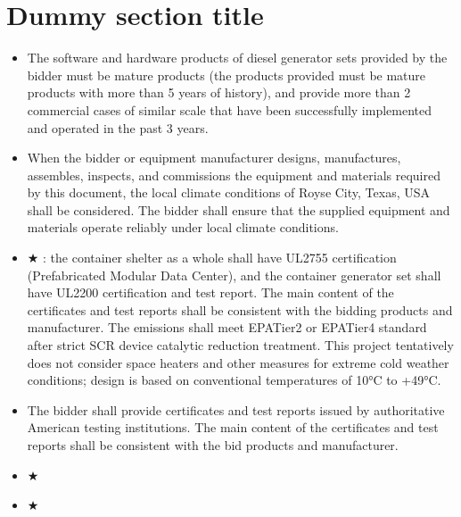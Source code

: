 \documentclass[a4paper,10pt,english,openany,oneside]{sphinxmanual}
\begin{document}
\section{Dummy section title}
\label{\detokenize{section2_requirements:id1}}\begin{itemize}
\item {} 
\sphinxAtStartPar
The software and hardware products of diesel generator sets provided by the bidder must be mature products (the products provided must be mature products with more than 5 years of history), and provide more than 2 commercial cases of similar scale that have been successfully implemented and operated in the past 3 years.

\item {} 
\sphinxAtStartPar
When the bidder or equipment manufacturer designs, manufactures, assembles, inspects, and commissions the equipment and materials required by this document, the local climate conditions of Royse City, Texas, USA shall be considered. The bidder shall ensure that the supplied equipment and materials operate reliably under local climate conditions.

\item {} 
\sphinxAtStartPar
★ : the container shelter as a whole shall have UL2755 certification (Prefabricated Modular Data Center), and the container generator set shall have UL2200 certification and test report. The main content of the certificates and test reports shall be consistent with the bidding products and manufacturer. The emissions shall meet EPA\sphinxhyphen{}Tier2 or EPA\sphinxhyphen{}Tier4 standard after strict SCR device catalytic reduction treatment. This project tentatively does not consider space heaters and other measures for extreme cold weather conditions; design is based on conventional temperatures of \sphinxhyphen{}10°C to +49°C.

\item {} 
\sphinxAtStartPar
The bidder shall provide certificates and test reports issued by authoritative American testing institutions. The main content of the certificates and test reports shall be consistent with the bid products and manufacturer.

\item {} 
\sphinxAtStartPar
★ 

\item {} 
\sphinxAtStartPar
★ 


\end{itemize}
\end{document}
